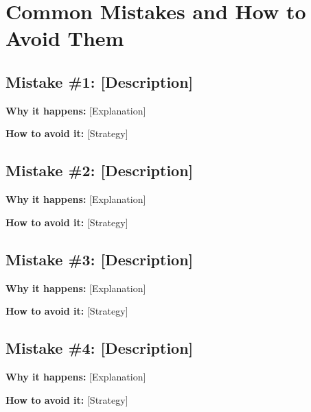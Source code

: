 \documentclass[12pt,letterpaper]{article}
\begin{document}
\begin{example}
\end{example}

\begin{solution}
\end{solution}


\section{Common Mistakes and How to Avoid Them}

\subsection{Mistake \#1: [Description]}

\textbf{Why it happens:} [Explanation]

\textbf{How to avoid it:} [Strategy]

\subsection{Mistake \#2: [Description]}

\textbf{Why it happens:} [Explanation]

\textbf{How to avoid it:} [Strategy]

\subsection{Mistake \#3: [Description]}

\textbf{Why it happens:} [Explanation]

\textbf{How to avoid it:} [Strategy]

\subsection{Mistake \#4: [Description]}

\textbf{Why it happens:} [Explanation]

\textbf{How to avoid it:} [Strategy]

\end{document}
